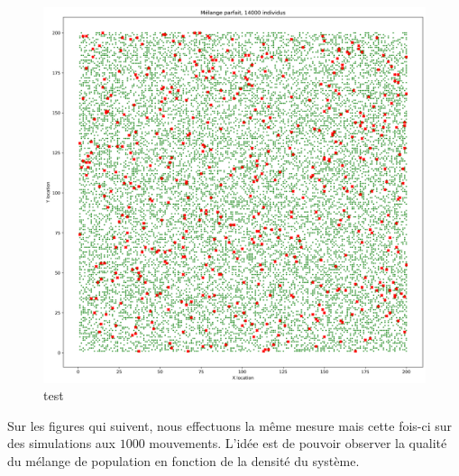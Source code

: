 \begin{figure}[h]
	\centering
	\captionsetup{justification=centering}
	\includegraphics[width=.7\textwidth]{Images/SI_positions_14k_mix.png}
	\caption{test}
\end{figure}

Sur les figures qui suivent, nous effectuons la même mesure mais cette fois-ci sur des simulations aux $1000$ mouvements. L'idée est de pouvoir observer la qualité du mélange de population en fonction de la densité du système.

\newpage

